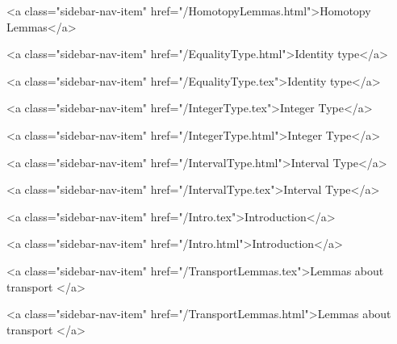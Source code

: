       
        
          <a class="sidebar-nav-item" href="/HomotopyLemmas.html">Homotopy Lemmas</a>
        
      
    
      
        
          <a class="sidebar-nav-item" href="/EqualityType.html">Identity type</a>
        
      
    
      
        
          <a class="sidebar-nav-item" href="/EqualityType.tex">Identity type</a>
        
      
    
      
        
          <a class="sidebar-nav-item" href="/IntegerType.tex">Integer Type</a>
        
      
    
      
        
          <a class="sidebar-nav-item" href="/IntegerType.html">Integer Type</a>
        
      
    
      
        
          <a class="sidebar-nav-item" href="/IntervalType.html">Interval Type</a>
        
      
    
      
        
          <a class="sidebar-nav-item" href="/IntervalType.tex">Interval Type</a>
        
      
    
      
        
          <a class="sidebar-nav-item" href="/Intro.tex">Introduction</a>
        
      
    
      
        
          <a class="sidebar-nav-item" href="/Intro.html">Introduction</a>
        
      
    
      
        
          <a class="sidebar-nav-item" href="/TransportLemmas.tex">Lemmas about transport </a>
        
      
    
      
        
          <a class="sidebar-nav-item" href="/TransportLemmas.html">Lemmas about transport </a>
        
      
    
